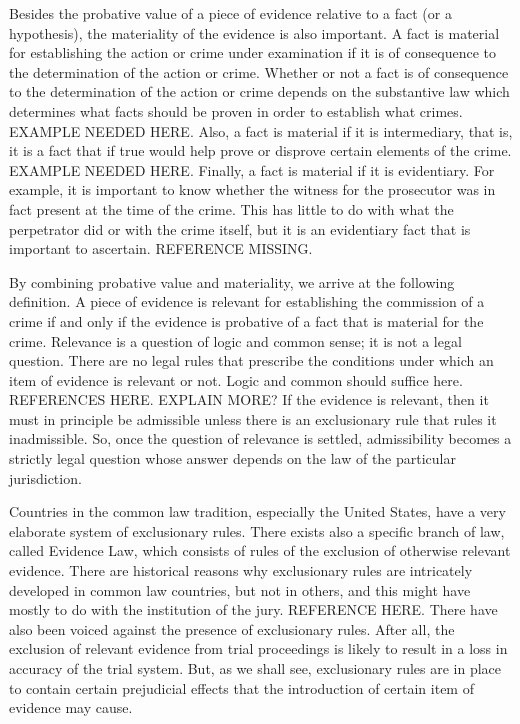 \documentclass[10pt]{article}
\begin{document}

Besides the probative value of a piece of evidence relative to a fact (or a hypothesis), the materiality of the evidence 
is also important. A fact is material for establishing the action or crime under examination if it is of consequence to the determination of the action or crime. Whether or not a fact is of consequence to the determination of the action or crime depends on the substantive law which determines what facts should be proven in order to establish what crimes. EXAMPLE NEEDED HERE. Also, a fact is material if it is intermediary, that is, it is a fact that if true would help prove or disprove certain elements of the crime. EXAMPLE NEEDED HERE. Finally, a fact is material if it is evidentiary. For example, it is important to know whether the witness for the prosecutor was in fact present at the time of the crime. This has little to do with what the perpetrator did or with the crime itself, but it is an evidentiary fact that is important to ascertain.  
REFERENCE MISSING. 

By combining probative value and materiality, we arrive at the following definition. A piece of evidence is relevant for establishing the commission of a 
crime if and only if the evidence is probative of a fact that is material for the crime. Relevance is a question of logic and common sense; it is not a legal question. 
There are no legal rules that prescribe the conditions under which an item of evidence is relevant or not. Logic and common should suffice here. REFERENCES HERE. EXPLAIN MORE?
If the evidence is relevant, then it must in principle be admissible unless there is an exclusionary rule that rules it inadmissible. 
So, once the question of relevance is settled, admissibility becomes a strictly legal question whose answer depends 
on the law of the particular jurisdiction. 


Countries in the common law tradition, especially the United States, have a very elaborate system of exclusionary rules. There exists also a specific branch of law, called Evidence Law, which consists of rules of the exclusion of otherwise relevant evidence. There are historical reasons why exclusionary rules are intricately developed in common law countries, but not in others, and this might have mostly to do with the institution of the jury. REFERENCE HERE. 
There have also been voiced against the presence of exclusionary rules. After all, the exclusion of relevant evidence from trial proceedings is likely to result in a loss in accuracy of the trial system. But, as we shall see, exclusionary rules are in place to contain 
certain prejudicial effects that the introduction of certain item of evidence may cause.
\end{document}
